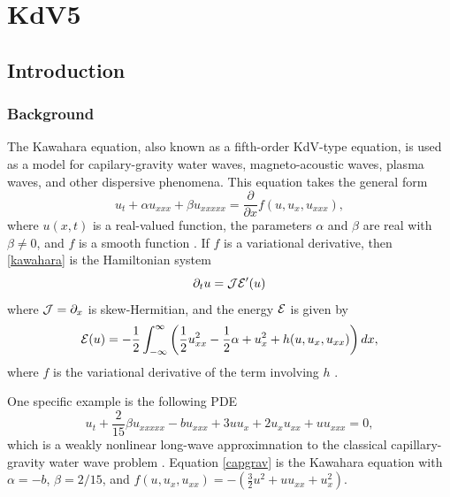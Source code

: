 \documentclass[thesis.tex]{subfiles}
\begin{document}
\iffulldocument\else
	\chapter{KdV5}
\fi

\section{Introduction}

\subsection{Background}

The Kawahara equation, also known as a fifth-order KdV-type equation, is used as a model for capilary-gravity water waves, magneto-acoustic waves, plasma waves, and other dispersive phenomena. This equation takes the general form
\begin{equation}\label{kawahara}
u_t + \alpha u_{xxx} + \beta u_{xxxxx} = \frac{\partial}{\partial x} f(u, u_x, u_{xxx}),
\end{equation}
where $u(x, t)$ is a real-valued function, the parameters $\alpha$ and $\beta$ are real with $\beta \neq 0$, and $f$ is a smooth function \cite{Bridges2002,Bridges2002a}. If $f$ is a variational derivative, then \eqref{kawahara} is the Hamiltonian system
\[
\partial_t u = \mathcal{J} \mathcal{E}'(u)
\]
where $\mathcal{J} = \partial_x$ is skew-Hermitian, and the energy $\mathcal{E}$ is given by
\[
\mathcal{E}(u) = -\frac{1}{2}\int_{-\infty}^\infty 
\left( \frac{1}{2}u_{xx}^2 - \frac{1}{2}\alpha + u_x^2 + h(u, u_x, u_{xx})\right)dx,
\]
where $f$ is the variational derivative of the term involving $h$ \cite{Bridges2002}.

One specific example is the following PDE
\begin{equation}\label{capgrav}
u_t + \frac{2}{15} \beta u_{xxxxx} - b u_{xxx}
+ 3 u u_x + 2 u_x u_{xx} + u u_{xxx} = 0,
\end{equation}
which is a weakly nonlinear long-wave approximnation to the classical capillary-gravity water wave problem \cite{Sandstede2013,Champneys1997,Champneys1998}. Equation \eqref{capgrav} is the Kawahara equation with $\alpha = -b$, $\beta = 2/15$, and $f(u, u_x, u_{xx}) = -(\frac{3}{2}u^2 + u u_{xx} + u_x^2)$.
\end{document}
